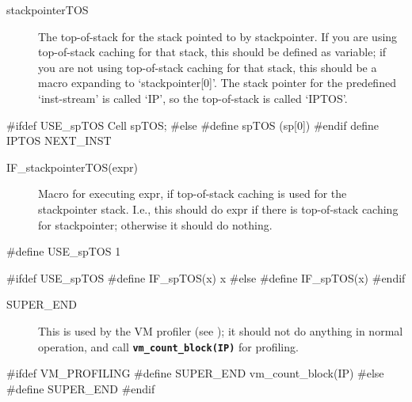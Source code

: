 \documentclass[10pt,english]{article}
\begin{document}
\begin{description}
\item [{stackpointerTOS}] The top-of-stack for the stack pointed to by
stackpointer. If you are using top-of-stack caching for that stack,
this should be defined as variable; if you are not using top-of-stack
caching for that stack, this should be a macro expanding to \textquoteleft{}stackpointer{[}0{]}\textquoteright{}.
The stack pointer for the predefined \textquoteleft{}inst-stream\textquoteright{}
is called \textquoteleft{}IP\textquoteright{}, so the top-of-stack
is called \textquoteleft{}IPTOS\textquoteright{}.
\end{description}
\nwenddocs{}\endmoddef
#ifdef USE_spTOS
  Cell   spTOS;
#else
#define spTOS (sp[0])
#endif
\nwendcode{}\nwdocspar
\nwenddocs{}\endmoddef
define IPTOS NEXT_INST
\nwendcode{}\nwdocspar

\begin{description}
\item [{IF\_stackpointerTOS(expr)}] Macro for executing expr, if top-of-stack
caching is used for the stackpointer stack. I.e., this should do expr
if there is top-of-stack caching for stackpointer; otherwise it should
do nothing.
\end{description}
\nwenddocs{}\endmoddef
#define USE_spTOS 1

#ifdef USE_spTOS
#define IF_spTOS(x) x
#else
#define IF_spTOS(x)
#endif
\nwendcode{}\nwdocspar

\begin{description}
\item [{SUPER\_END}] This is used by the VM profiler (see );
it should not do anything in normal operation, and call \texttt{\textbf{vm\_count\_block(IP)}}
for profiling.
\end{description}
\nwenddocs{}\endmoddef
#ifdef VM_PROFILING
#define SUPER_END  vm_count_block(IP)
#else
#define SUPER_END
#endif
\nwendcode{}\nwdocspar
\end{document}
